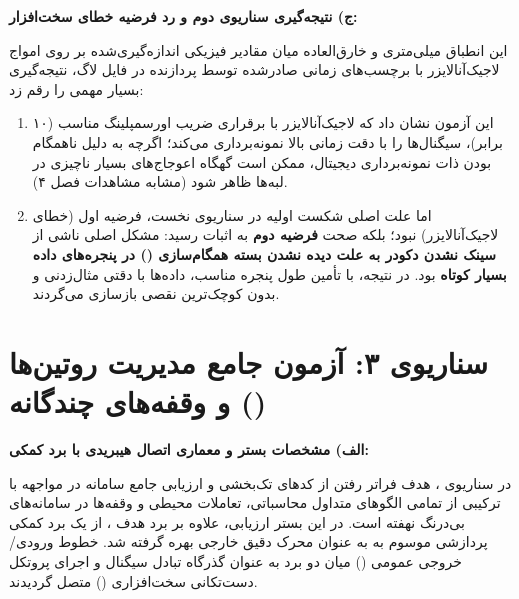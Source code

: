 \vspace{0.4cm}
\noindent
\textbf{ج) نتیجه‌گیری سناریوی دوم و رد فرضیه خطای سخت‌افزار:}\par
این انطباق میلی‌متری و خارق‌العاده میان مقادیر فیزیکی اندازه‌گیری‌شده بر روی امواج لاجیک‌آنالایزر با برچسب‌های زمانی صادرشده توسط پردازنده در فایل لاگ، نتیجه‌گیری بسیار مهمی را رقم زد:
\begin{enumerate}
    \item این آزمون نشان داد که لاجیک‌آنالایزر با برقراری ضریب اورسمپلینگ مناسب (۱۰ برابر)، سیگنال‌ها را با دقت زمانی بالا نمونه‌برداری می‌کند؛ اگرچه به دلیل ناهمگام بودن ذات نمونه‌برداری دیجیتال، ممکن است گهگاه اعوجاج‌های بسیار ناچیزی در لبه‌ها ظاهر شود (مشابه مشاهدات فصل ۴).
    \item اما علت اصلی شکست اولیه در سناریوی نخست، فرضیه اول (خطای لاجیک‌آنالایزر) نبود؛ بلکه صحت \textbf{فرضیه دوم} به اثبات رسید: مشکل اصلی ناشی از \textbf{سینک نشدن دکودر به علت دیده نشدن بسته همگام‌سازی () در پنجره‌های داده بسیار کوتاه} بود. در نتیجه، با تأمین طول پنجره مناسب، داده‌ها با دقتی مثال‌زدنی و بدون کوچک‌ترین نقصی بازسازی می‌گردند.
\end{enumerate}

\section[سناریوی ۳: آزمون جامع مدیریت روتین‌ها و وقفه‌های چندگانه (\lr{Routine\_Irq})]{سناریوی ۳: آزمون جامع مدیریت روتین‌ها\\ و وقفه‌های چندگانه ()}
\label{sec:test_routine_irq}

\noindent
\textbf{الف) مشخصات بستر و معماری اتصال هیبریدی با برد کمکی:}\par
در سناریوی ، هدف فراتر رفتن از کدهای تک‌بخشی و ارزیابی جامع سامانه در مواجهه با ترکیبی از تمامی الگوهای متداول محاسباتی، تعاملات محیطی و وقفه‌ها در سامانه‌های بی‌درنگ نهفته است. در این بستر ارزیابی، علاوه بر برد هدف ، از یک برد کمکی پردازشی موسوم به  به عنوان محرک دقیق خارجی بهره گرفته شد. خطوط ورودی/خروجی عمومی () میان دو برد به عنوان گذرگاه تبادل سیگنال و اجرای پروتکل دست‌تکانی سخت‌افزاری () متصل گردیدند.

